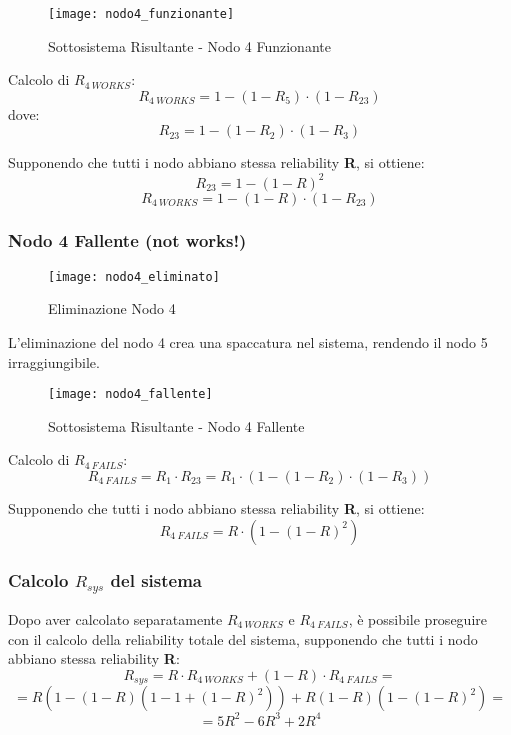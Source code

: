 \clearpage

\begin{figure}[!htbp]
  \centering
  \texttt{[image: nodo4\_funzionante]}
  \caption{Sottosistema Risultante - Nodo 4 Funzionante}
  \label{nodo4_funzionante}
\end{figure}

Calcolo di $R_{4\ WORKS}$:
$$R_{4\ WORKS} = 1-(1-R_5)\cdot(1-R_{23})$$
dove:
$$R_{23} = 1-(1-R_2)\cdot(1-R_3)$$

Supponendo che tutti i nodo abbiano stessa reliability \textbf{R}, si ottiene:
$$R_{23} = 1-(1-R)^2$$
$$R_{4\ WORKS} = 1-(1-R)\cdot(1-R_{23})$$

\clearpage

\subsubsection*{Nodo 4 Fallente (not works!)}

\begin{figure}[!htbp]
  \centering
  \texttt{[image: nodo4\_eliminato]}
  \caption{Eliminazione Nodo 4}
  \label{nodo4_eliminato}
\end{figure}

L'eliminazione del nodo 4 crea una spaccatura nel sistema, rendendo il nodo 5
irraggiungibile.\\

\begin{figure}[!htbp]
  \centering
  \texttt{[image: nodo4\_fallente]}
  \caption{Sottosistema Risultante - Nodo 4 Fallente}
  \label{nodo4_fallente}
\end{figure}

Calcolo di $R_{4\ FAILS}$:
$$R_{4\ FAILS} = R_1 \cdot R_{23} = R_1 \cdot (1-(1-R_2)\cdot(1-R_3))$$

Supponendo che tutti i nodo abbiano stessa reliability \textbf{R}, si ottiene:
$$R_{4\ FAILS} = R \cdot (1-(1-R)^2)$$

\clearpage

\subsubsection{Calcolo $R_{sys}$ del sistema}
Dopo aver calcolato separatamente $R_{4\ WORKS}$ e $R_{4\ FAILS}$, è possibile
proseguire con il calcolo della reliability totale del sistema, supponendo che
tutti i nodo abbiano stessa reliability \textbf{R}:
$$R_{sys} = R \cdot R_{4\ WORKS} + (1-R)\cdot R_{4\ FAILS} =$$
$$= R(1-(1-R)(1-1+(1-R)^2)) + R(1-R)(1-(1-R)^2) =$$
$$= 5R^2-6R^3+2R^4$$

